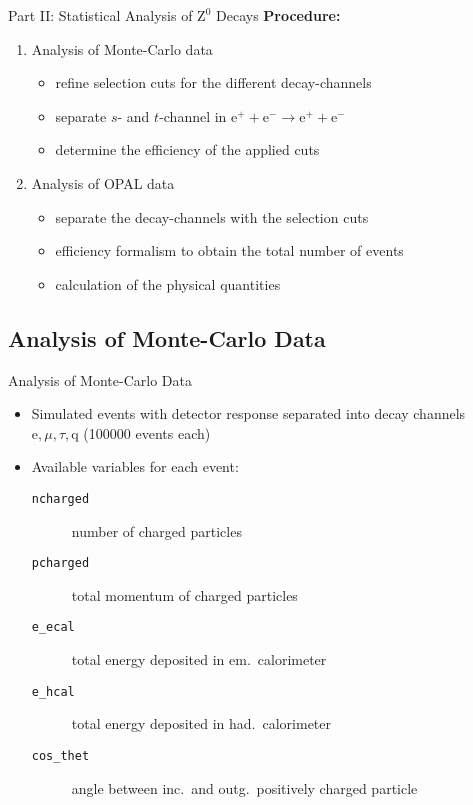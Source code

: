 \documentclass[11pt,xcolor=dvipsnames,professionalfonts]{beamer}
\begin{document}
\begin{frame}{Part II: Statistical Analysis of $\mathrm{Z}^0$ Decays}
	\textbf{Procedure:}
	\begin{enumerate}
		\setlength\itemsep{2.em}
		\item Analysis of Monte-Carlo data
		\begin{itemize}
			\setlength\itemsep{0.5em}
			\item refine selection cuts for the different decay-channels
			
			\item separate $s$- and $t$-channel in $\mathrm{e}^+ + \mathrm{e}^- \rightarrow \mathrm{e}^+ + \mathrm{e}^-$
			
			\item determine the efficiency of the applied cuts
		\end{itemize}
		
		\item Analysis of OPAL data
		\begin{itemize}
			\setlength\itemsep{0.5em}
			\item separate the decay-channels with the selection cuts
			
			\item efficiency formalism to obtain the total number of events
			
			\item calculation of the physical quantities
		\end{itemize}
	\end{enumerate}
\end{frame}

\subsection{Analysis of Monte-Carlo Data}

\begin{frame}{Analysis of Monte-Carlo Data}
	\begin{itemize}
		\setlength\itemsep{2.em}
		\item Simulated events with detector response separated into decay channels $\mathrm{e}, \mu, \tau, \mathrm{q}$ (\num{100000} events each)
		
		\item Available variables for each event:
		\begin{description}
			\item[\texttt{ncharged}] number of charged particles
			\item[\texttt{pcharged}] total momentum of charged particles
			\item[\texttt{e\_ecal}] total energy deposited in em.\ calorimeter
			\item[\texttt{e\_hcal}] total energy deposited in had.\ calorimeter
			\item[\texttt{cos\_thet}] angle between inc.\ and outg.\ positively charged particle
		\end{description}
	\end{itemize}
\end{frame}
\end{document}
